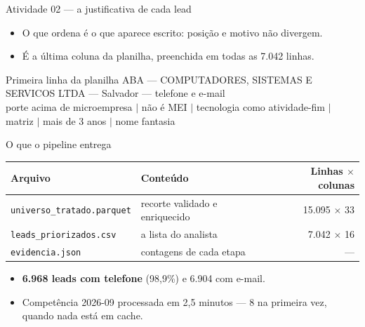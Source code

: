 \documentclass[aspectratio=169]{beamer}
\newcommand{\leads}{7.042}
\begin{document}
\begin{frame}{Atividade 02 --- a justificativa de cada lead}
    \begin{itemize}
        \item O que ordena é o que aparece escrito: posição e motivo não
              divergem.
        \item É a última coluna da planilha, preenchida em todas as \leads{}
              linhas.
    \end{itemize}

    \begin{block}{Primeira linha da planilha}
        \footnotesize
        ABA --- COMPUTADORES, SISTEMAS E SERVICOS LTDA --- Salvador ---
        telefone e e-mail \\[1mm]
        porte acima de microempresa $|$ não é MEI $|$ tecnologia como
        atividade-fim $|$ matriz $|$ mais de 3 anos $|$ nome fantasia
    \end{block}
\end{frame}

\begin{frame}{O que o pipeline entrega}
    \begin{table}
        \small
        \begin{tabular}{llr}
            \toprule
            Arquivo & Conteúdo & Linhas $\times$ colunas \\
            \midrule
            \texttt{universo\_tratado.parquet} & recorte validado e enriquecido & 15.095 $\times$ 33 \\
            \texttt{leads\_priorizados.csv}    & a lista do analista            &  7.042 $\times$ 16 \\
            \texttt{evidencia.json}            & contagens de cada etapa        & --- \\
            \bottomrule
        \end{tabular}
    \end{table}

    \begin{itemize}
        \item \textbf{6.968 leads com telefone} (98,9\%) e 6.904 com e-mail.
        \item Competência 2026-09 processada em 2,5 minutos --- 8 na primeira
              vez, quando nada está em cache.
    \end{itemize}
\end{frame}
\end{document}
